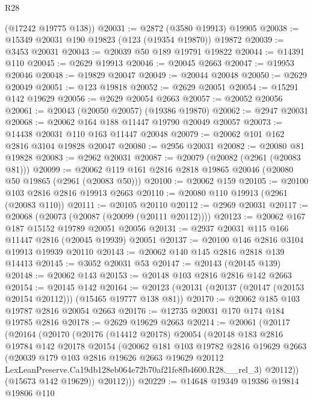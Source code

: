 \begin{lexlean}{R28}
\begin{coremodule}
      (@17242 @19775 @138))
@20031 := @2872 (@3580 @19913) @19905
@20038 := @15349 @20031 @190 @19823 (@123 (@19354 @19870)) @19872
@20039 := @3453 @20031
@20043 := @20039 @50 @189 @19791 @19822
@20044 := @14391 @110
@20045 := @2629 @19913
@20046 := @20045 @2663
@20047 := @19953 @20046
@20048 := @19829 @20047
@20049 := @20044 @20048
@20050 := @2629 @20049
@20051 := @123 @19818
@20052 := @2629 @20051
@20054 := @15291 @142 @19629
@20056 := @2629 @20054 @2663
@20057 := @20052 @20056
@20061 := @20043 (@20050 @20057) (@19386 @19870)
@20062 := @2947 @20031
@20068 := @20062 @164 @188 @11447 @19790 @20049 @20057
@20073 := @14438 @20031 @110 @163 @11447 @20048
@20079 := @20062 @101 @162 @2816 @3104 @19828 @20047
@20080 := @2956 @20031
@20082 := @20080 @81 @19828
@20083 := @2962 @20031
@20087 := @20079 (@20082 (@2961 (@20083 @81)))
@20099 := @20062 @119 @161 @2816 @2818 @19865 @20046 (@20080 @50 @19865 (@2961 (@20083 @50)))
@20100 := @20062 @159
@20105 := @20100 @103 @2816 @2816 @19913 @2663
@20110 := @20080 @110 @19913 (@2961 (@20083 @110))
@20111 := @20105 @20110
@20112 := @2969 @20031
@20117 := @20068 (@20073 (@20087 (@20099 (@20111 @20112))))
@20123 := @20062 @167 @187 @15152 @19789 @20051 @20056
@20131 := @2937 @20031 @115 @166 @11447 @2816 (@20045 @19939) @20051
@20137 := @20100 @146 @2816 @3104 @19913 @19939 @20110
@20143 := @20062 @140 @145 @2816 @2818 @139 @14413
@20145 := @3052 @20031 @53
@20147 := @20143 (@20145 @139)
@20148 := @20062 @143
@20153 := @20148 @103 @2816 @2816 @142 @2663
@20154 := @20145 @142
@20164 := @20123 (@20131 (@20137 (@20147 (@20153 @20154 @20112))) (@15465 @19777 @138 @81))
@20170 := @20062 @185 @103 @19787 @2816 @20054 @2663
@20176 := @12735 @20031 @170 @174 @184 @19785 @2816
@20178 := @2629 @19629 @2663
@20214 := @20061
    (@20117
      (@20164
        (@20170
          (@20176
            (@14412 @20178)
            @20054
            (@20148
              @183
              @2816
              @19784
              @142
              @20178
              @20154
              (@20062
                @181
                @103
                @19782
                @2816
                @19629
                @2663
                (@20039
                  @179
                  @103
                  @2816
                  @19626
                  @2663
                  @19629
                  @20112
                  LexLeanPreserve.Ca19db128eb064e72b70af21fe8fb4600.R28.__rel_3)
                @20112))
            (@15673 @142 @19629))
          @20112)))
@20229 := @14648
    @19349
    @19386
    @19814
    @19806
    @110

\end{coremodule}
\end{lexlean}
